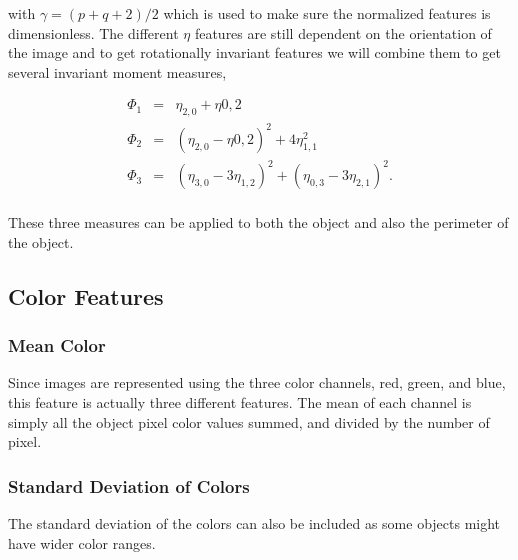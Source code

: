 with $\gamma =(p+q+2)/2$ which is used to make sure the normalized features is dimensionless. The different $\eta$ features are still dependent on the orientation of the image and to get rotationally invariant features we will combine them to get several invariant moment measures,

\begin{equation}
    \begin{array}{rcl}
        \Phi_1 & = & \eta_{2,0}+\eta{0,2} \\
        \Phi_2 & = & (\eta_{2,0}-\eta{0,2})^2+ 4\eta_{1,1}^2 \\
        \Phi_3 & = & (\eta_{3,0}-3\eta_{1,2})^2+(\eta_{0,3}-3\eta_{2,1})^2. \\
    \end{array}
\end{equation}

These three measures can be applied to both the object and also the perimeter of the object.

\subsection{Color Features}

\subsubsection{Mean Color}

Since images are represented using the three color channels, red, green, and blue, this feature is actually three different features. The mean of each channel is simply all the object pixel color values summed, and divided by the number of pixel.

\subsubsection{Standard Deviation of Colors}

The standard deviation of the colors can also be included as some objects might have wider color ranges.

